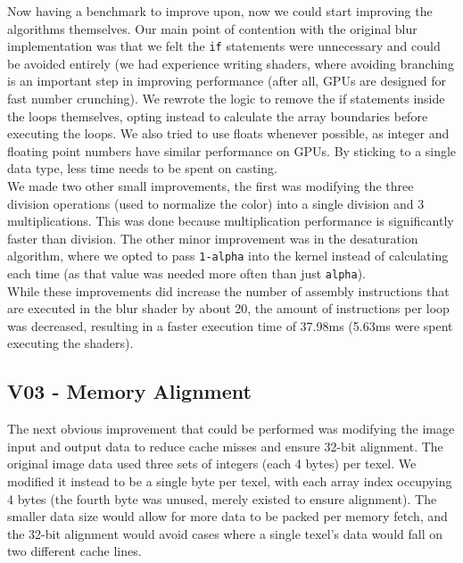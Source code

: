 \documentclass[10pt,journal,compsoc]{IEEEtran}
\def\code#1{\texttt{#1}}
\begin{document}
\noindent Now having a benchmark to improve upon, now we could start improving the algorithms themselves. Our main point of contention with the original blur implementation was that we felt the \code{if} statements were unnecessary and could be avoided entirely (we had experience writing shaders, where avoiding branching is an important step in improving performance (after all, GPUs are designed for fast number crunching). We rewrote the logic to remove the if statements inside the loops themselves, opting instead to calculate the array boundaries before executing the loops. We also tried to use floats whenever possible, as integer and floating point numbers have similar performance on GPUs. By sticking to a single data type, less time needs to be spent on casting. \\

\noindent We made two other small improvements, the first was modifying the three division operations (used to normalize the color) into a single division and 3 multiplications. This was done because multiplication performance is significantly faster than division. The other minor improvement was in the desaturation algorithm, where we opted to pass \code{1-alpha} into the kernel instead of calculating each time (as that value was needed more often than just \code{alpha}). \\

\noindent While these improvements did increase the number of assembly instructions that are executed in the blur shader by about 20, the amount of instructions per loop was decreased, resulting in a faster execution time of 37.98ms (5.63ms were spent executing the shaders). \\


\subsection{V03 - Memory Alignment}
\label{sec:V03}

\noindent The next obvious improvement that could be performed was modifying the image input and output data to reduce cache misses and ensure 32-bit alignment. The original image data used three sets of integers (each 4 bytes) per texel. We modified it instead to be a single byte per texel, with each array index occupying 4 bytes (the fourth byte was unused, merely existed to ensure alignment). The smaller data size would allow for more data to be packed per memory fetch, and the 32-bit alignment would avoid cases where a single texel's data would fall on two different cache lines. \\
\end{document}
